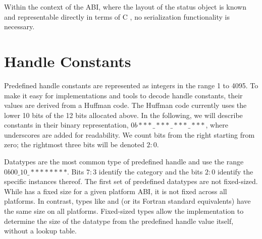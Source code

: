 %

%

%

%

%

\bindingislistfalse
{}%

Within the context of the ABI, where the layout of the status object
is known and representable directly in terms of C ,
no serialization functionality is necessary.

\section{Handle Constants}
\label{sec:handle-abi}

Predefined handle constants are represented as integers in the range 1 to 4095.
To make it easy for implementations and tools to decode handle constants,
their values are derived from a Huffman code.
The Huffman code currently uses the lower 10 bits of the 12 bits allocated above.
In the following, we will describe constants in their binary representation,
$0b***\_***\_***\_***$, where underscores are added for readability.
We count bits from the right starting from zero; the rightmost three bits
will be denoted $2:0$.

Datatypes are the most common type of predefined handle and use the range $0b00\_10\_********$.
Bits $7:3$ identify the category and the bits $2:0$ identify the specific instances thereof.
The first set of predefined datatypes are not fixed-sized.
While  has a fixed size for a given platform ABI, it is not fixed across all platforms.
In contrast, types like  and  (or its Fortran standard equivalents)
have the same size on all platforms.
Fixed-sized types allow the implementation to determine the size of the datatype
from the predefined handle value itself, without a lookup table.

